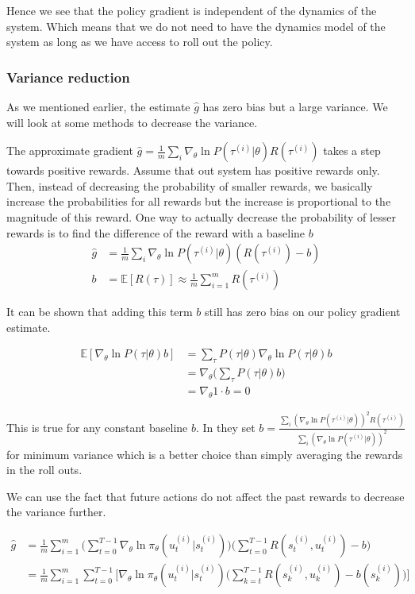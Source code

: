 \documentclass{article}[11pt]
\begin{document}
Hence we see that the policy gradient is independent of the dynamics of the system. Which means that we do not need to have the dynamics model of the system as long as we have access to roll out the policy. 

\subsubsection{Variance reduction}

As we mentioned earlier, the estimate $\hat{g}$ has zero bias but a large variance. We will look at some methods to decrease the variance. 

The approximate gradient $\hat{g} = \frac{1}{m} \sum_i \nabla_\theta \ln P(\tau^{(i)}|\theta) R(\tau^{(i)})$ takes a step towards positive rewards. Assume that out system has positive rewards only. Then, instead of decreasing the probability of smaller rewards, we basically increase the probabilities for all rewards but the increase is proportional to the magnitude of this reward. One way to actually decrease the probability of lesser rewards is to find the difference of the reward with a baseline $b$
\begin{align*}
\hat{g} &= \frac{1}{m} \sum_i \nabla_\theta \ln P(\tau^{(i)}|\theta) (R(\tau^{(i)}) - b)\\
b &= \mathbb{E}[R(\tau)] \approx \frac{1}{m}\sum_{i=1}^m R(\tau^{(i)})
\end{align*}


It can be shown that adding this term $b$ still has zero bias on our policy gradient estimate. 

\begin{align*}
\mathbb{E}[\nabla_\theta \ln P(\tau|\theta)b] &= \sum_\tau P(\tau|\theta)\nabla_\theta \ln P(\tau|\theta)b\\
&= \nabla_\theta \Big(\sum_{\tau}P(\tau|\theta)b\Big)\\
&= \nabla_\theta 1 \cdot b = 0
\end{align*} 

This is true for any constant baseline $b$. In \cite{greensmith2004variance} they set $b = \frac{\sum_i(\nabla_\theta \ln P(\tau^{(i)} | \theta))^2 R(\tau^{(i)})}{\sum_i(\nabla_\theta \ln P(\tau^{(i)} | \theta))^2}$ for minimum variance which is a better choice than simply averaging the rewards in the roll outs. 

We can use the fact that future actions do not affect the past rewards to decrease the variance further. 

\begin{align}
\hat{g} &= \frac{1}{m} \sum_{i=1}^m \Big( \sum_{t=0}^{T-1} \nabla_\theta \ln \pi_\theta(u_{t}^{(i)}|s_{t}^{(i)})  \Big) \Big( \sum_{t=0}^{T-1}R(s_t^{(i)}, u_t^{(i)}) - b\Big)\\
\label{time_variance_reduction}
 &= \frac{1}{m} \sum_{i=1}^m  \sum_{t=0}^{T-1}\Bigg[ \nabla_\theta \ln \pi_\theta(u_{t}^{(i)}|s_{t}^{(i)}) \Big( \sum_{k=t}^{T-1}R(s_k^{(i)}, u_k^{(i)}) - b(s_k^{(i)})\Big)\Bigg]
\end{align}
\end{document}
